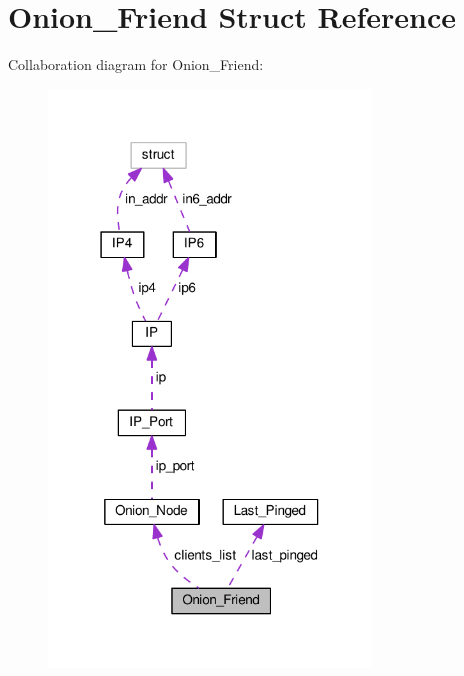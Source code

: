 \hypertarget{struct_onion___friend}{\section{Onion\+\_\+\+Friend Struct Reference}
\label{struct_onion___friend}
}


Collaboration diagram for Onion\+\_\+\+Friend\+:
\nopagebreak
\begin{figure}[H]
\begin{center}
\leavevmode
\includegraphics[width=243pt]{struct_onion___friend__coll__graph}
\end{center}
\end{figure}
